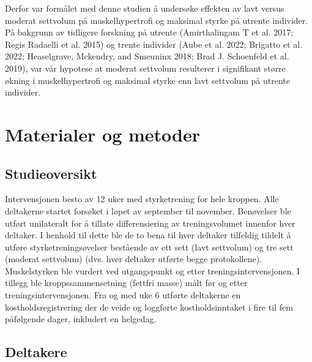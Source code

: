 \documentclass[
  letterpaper,
  DIV=11,
  numbers=noendperiod]{scrreprt}
\begin{document}
Derfor var formålet med denne studien å undersøke effekten av lavt
versus moderat settvolum på muskelhypertrofi og maksimal styrke på
utrente individer. På bakgrunn av tidligere forskning på utrente
(Amirthalingam T et al. 2017; Regis Radaelli et al. 2015) og trente
individer (Aube et al. 2022; Brigatto et al. 2022; Heaselgrave,
Mckendry, and Smeuninx 2018; Brad J. Schoenfeld et al. 2019), var vår
hypotese at moderat settvolum resulterer i signifikant større økning i
muskelhypertrofi og maksimal styrke enn lavt settvolum på utrente
individer.

\hypertarget{materialer-og-metoder-1}{%
\section{Materialer og metoder}\label{materialer-og-metoder-1}}

\hypertarget{studieoversikt}{%
\subsection{Studieoversikt}\label{studieoversikt}}

Intervensjonen besto av 12 uker med styrketrening for hele kroppen. Alle
deltakerne startet forsøket i løpet av september til november.
Benøvelser ble utført unilateralt for å tillate differensiering av
treningsvolumet innenfor hver deltaker. I henhold til dette ble de to
bena til hver deltaker tilfeldig tildelt å utføre styrketreningsøvelser
bestående av ett sett (lavt settvolum) og tre sett (moderat settvolum)
(dvs. hver deltaker utførte begge protokollene). Muskelstyrken ble
vurdert ved utgangspunkt og etter treningsintervensjonen. I tillegg ble
kroppssammensetning (fettfri masse) målt før og etter
treningsintervensjonen. Fra og med uke 6 utførte deltakerne en
kostholdsregistrering der de veide og loggførte kostholdsinntaket i fire
til fem påfølgende dager, inkludert en helgedag.

\hypertarget{deltakere}{%
\subsection{Deltakere}\label{deltakere}}
\end{document}
